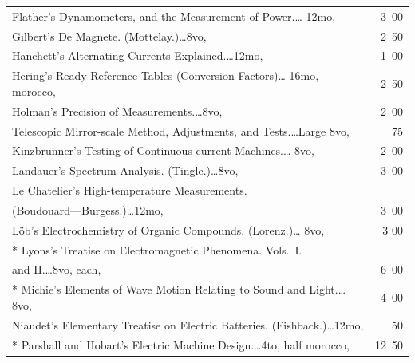 \documentclass[a4paper,12pt]{book}[2004/02/16]
\theoremstyle{ilemma}
\theoremstyle{itheorem}
\theoremstyle{iother}
\theoremstyle{icorollary}
\theoremstyle{numcorollary}
\theoremstyle{idefinition}
\begin{document}
\begin{longtable}{@{}l@{ }r@{}}
Flather's Dynamometers, and the Measurement of Power.\dotfill\ldots
12mo, &3\ 00\\

Gilbert's De Magnete. (Mottelay.)\dotfill\ldots 8vo, &2\ 50\\

Hanchett's Alternating Currents Explained.\dotfill\ldots 12mo, &1\ 00\\

Hering's Ready Reference Tables (Conversion Factors)\dotfill\ldots
16mo, morocco, &2\ 50\\

Holman's Precision of Measurements.\dotfill\ldots 8vo, &2\ 00\\

\nopagebreak

\indent Telescopic Mirror-scale Method, Adjustments, and
Tests.\dotfill\ldots Large 8vo, & 75\\

Kinzbrunner's Testing of Continuous-current Machines.\dotfill\ldots
8vo, &2\ 00\\

Landauer's Spectrum Analysis. (Tingle.)\dotfill\ldots 8vo, &3\ 00\\

Le Chatelier's High-temperature Measurements.\\

\nopagebreak

\indent\indent (Boudouard---Burgess.)\dotfill\ldots 12mo, &3\ 00\\

L\"ob's Electrochemistry of Organic Compounds. (Lorenz.)\dotfill\ldots
8vo, &3 00\\

* Lyons's Treatise on Electromagnetic Phenomena. Vols.~I.\\

\nopagebreak

\indent\indent and II.\dotfill\ldots 8vo, each, &6\ 00\\

* Michie's Elements of Wave Motion Relating to Sound and
  Light.\dotfill\ldots 8vo, &4\ 00\\

Niaudet's Elementary Treatise on Electric
Batteries. (Fishback.)\dotfill\ldots 12mo, &\ 50\\

* Parshall and Hobart's Electric Machine Design.\dotfill\ldots 4to,
  half morocco, &12\ 50\\


\end{longtable}
\end{document}
